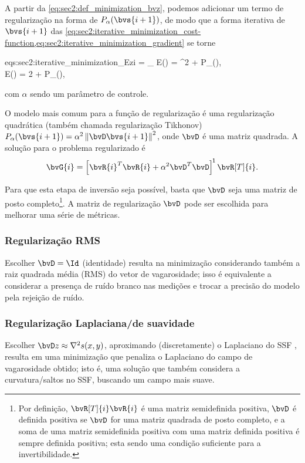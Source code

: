A partir da \cref{eq:sec2:def_minimization_bvz}, podemos adicionar um termo de regularização na forma de $P_{\alpha}(\bvs{i+1})$, de modo que a forma iterativa de $\bvs{i+1}$ das \cref{eq:sec2:iterative_minimization_cost-function,eq:sec2:iterative_minimization_gradient} se torne
\begin{subgather}{eqs:sec2:iterative_minimization_Ezi}
	 = \arg\min_{} E() = ^2 + P_\alpha(),\\		
	\nabla E() = 2  + \nabla P_{\alpha}(),
\end{subgather}
com $\alpha$ sendo um parâmetro de controle.

O modelo mais comum para a função de regularização é uma regularização quadrática (também chamada regularização Tikhonov) $P_{\alpha}(\bvs{i+1}) = \alpha^2\norm{\bvD\bvs{i+1}}^2$, onde $\bvD$ é uma matriz quadrada. A solução para o problema regularizado é
\begin{equation}
	\bvG{i} = \inv*{\tr{\bvR{i}} \bvR{i} + \alpha^2 \tr{\bvD}\bvD} \bvR[T]{i}.
	\label{eq:sec2:solution_regularization-problem_simple}
\end{equation}

Para que esta etapa de inversão seja possível, basta que $\bvD$ seja uma matriz de posto completo\footnote{\label{footnote:positive-definite_inversion}Por definição, $\bvR[T]{i} \bvR{i}$ é uma matriz semidefinida positiva, $\bvD$ é definida positiva se $\bvD$ for uma matriz quadrada de posto completo, e a soma de uma matriz semidefinida positiva com uma matriz definida positiva é sempre definida positiva; esta sendo uma condição suficiente para a invertibilidade.}. A matriz de regularização $\bvD$ pode ser escolhida para melhorar uma série de métricas.

\subsubsection*{Regularização RMS}
Escolher $\bvD = \Id$ (identidade) \cite{phillips_traveltime_1991} resulta na minimização considerando também a raiz quadrada média (RMS) do vetor de vagarosidade; isso é equivalente a considerar a presença de ruído branco nas medições e trocar a precisão do modelo pela rejeição de ruído.

\subsubsection*{Regularização Laplaciana/de suavidade}
Escolher $\bvD z \approx \nabla^2 s(x,y)$, aproximando (discretamente) o Laplaciano do SSF \cite{zhang_nonlinear_1998,ali_opensource_2019}, resulta em uma minimização que penaliza o Laplaciano do campo de vagarosidade obtido; isto é, uma solução que também considera a curvatura/saltos no SSF, buscando um campo mais suave.

